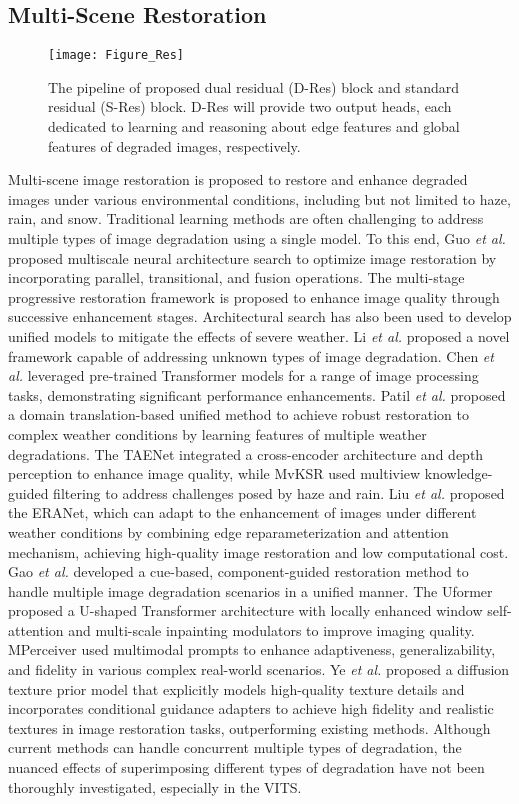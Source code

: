 \subsection{Multi-Scene Restoration}
%
    \begin{figure*}[t]
        \centering
        \setlength{\abovecaptionskip}{0.cm}
        \texttt{[image: Figure\_Res]}
        \caption{The pipeline of proposed dual residual (D-Res) block and standard residual (S-Res) block. D-Res will provide two output heads, each dedicated to learning and reasoning about edge features and global features of degraded images, respectively.}
        \label{Figure_Res}
    \end{figure*}
    Multi-scene image restoration is proposed to restore and enhance degraded images under various environmental conditions, including but not limited to haze, rain, and snow. Traditional learning methods are often challenging to address multiple types of image degradation using a single model. To this end, Guo \textit{et al.} \citep{gou2020clearer} proposed multiscale neural architecture search to optimize image restoration by incorporating parallel, transitional, and fusion operations. The multi-stage progressive restoration framework \citep{zamir2021multi} is proposed to enhance image quality through successive enhancement stages. Architectural search \citep{li2020all} has also been used to develop unified models to mitigate the effects of severe weather. Li \textit{et al.} \citep{li2022all} proposed a novel framework capable of addressing unknown types of image degradation. Chen \textit{et al.} \citep{chen2021pre} leveraged pre-trained Transformer models for a range of image processing tasks, demonstrating significant performance enhancements. Patil \textit{et al.} \citep{patil2023multi} proposed a domain translation-based unified method to achieve robust restoration to complex weather conditions by learning features of multiple weather degradations. The TAENet \citep{fang2024taenet} integrated a cross-encoder architecture and depth perception to enhance image quality, while MvKSR \citep{xu2024mvksr} used multiview knowledge-guided filtering to address challenges posed by haze and rain. Liu \textit{et al.} \citep{liu2024real} proposed the ERANet, which can adapt to the enhancement of images under different weather conditions by combining edge reparameterization and attention mechanism, achieving high-quality image restoration and low computational cost. Gao \textit{et al.} \citep{gao2024prompt} developed a cue-based, component-guided restoration method to handle multiple image degradation scenarios in a unified manner. The Uformer \citep{wang2022uformer} proposed a U-shaped Transformer architecture with locally enhanced window self-attention and multi-scale inpainting modulators to improve imaging quality. MPerceiver \citep{ai2024multimodal} used multimodal prompts to enhance adaptiveness, generalizability, and fidelity in various complex real-world scenarios. Ye \textit{et al.} \citep{ye2024learning} proposed a diffusion texture prior model that explicitly models high-quality texture details and incorporates conditional guidance adapters to achieve high fidelity and realistic textures in image restoration tasks, outperforming existing methods. Although current methods can handle concurrent multiple types of degradation, the nuanced effects of superimposing different types of degradation have not been thoroughly investigated, especially in the VITS.
%